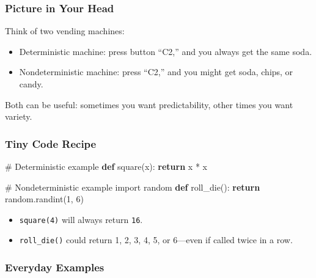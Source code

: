 \documentclass[
  letterpaper,
  DIV=11,
  numbers=noendperiod]{scrreprt}
\newenvironment{Shaded}{\begin{snugshade}}{\end{snugshade}}
\newcommand{\CommentTok}[1]{\textcolor[rgb]{0.37,0.37,0.37}{#1}}
\newcommand{\ControlFlowTok}[1]{\textcolor[rgb]{0.00,0.23,0.31}{\textbf{#1}}}
\newcommand{\DecValTok}[1]{\textcolor[rgb]{0.68,0.00,0.00}{#1}}
\newcommand{\ImportTok}[1]{\textcolor[rgb]{0.00,0.46,0.62}{#1}}
\newcommand{\KeywordTok}[1]{\textcolor[rgb]{0.00,0.23,0.31}{\textbf{#1}}}
\newcommand{\NormalTok}[1]{\textcolor[rgb]{0.00,0.23,0.31}{#1}}
\newcommand{\OperatorTok}[1]{\textcolor[rgb]{0.37,0.37,0.37}{#1}}
\providecommand{\tightlist}{%
  \setlength{\itemsep}{0pt}\setlength{\parskip}{0pt}}
\begin{document}
\subsubsection{Picture in Your Head}\label{picture-in-your-head-2}

Think of two vending machines:

\begin{itemize}
\tightlist
\item
  Deterministic machine: press button ``C2,'' and you always get the
  same soda.
\item
  Nondeterministic machine: press ``C2,'' and you might get soda, chips,
  or candy.
\end{itemize}

Both can be useful: sometimes you want predictability, other times you
want variety.

\subsubsection{Tiny Code Recipe}\label{tiny-code-recipe-2}

\begin{Shaded}
\begin{Highlighting}[]
\CommentTok{\# Deterministic example}
\KeywordTok{def}\NormalTok{ square(x):}
    \ControlFlowTok{return}\NormalTok{ x }\OperatorTok{*}\NormalTok{ x}

\CommentTok{\# Nondeterministic example}
\ImportTok{import}\NormalTok{ random}
\KeywordTok{def}\NormalTok{ roll\_die():}
    \ControlFlowTok{return}\NormalTok{ random.randint(}\DecValTok{1}\NormalTok{, }\DecValTok{6}\NormalTok{)}
\end{Highlighting}
\end{Shaded}

\begin{itemize}
\tightlist
\item
  \texttt{square(4)} will always return \texttt{16}.
\item
  \texttt{roll\_die()} could return 1, 2, 3, 4, 5, or 6---even if called
  twice in a row.
\end{itemize}

\subsubsection{Everyday Examples}\label{everyday-examples-1}
\end{document}

